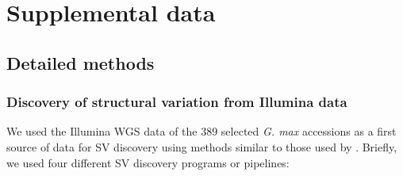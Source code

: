 \chapter*{Supplemental data}
\label{supdata}

\renewcommand\thefigure{S\arabic{figure}} 
\setcounter{figure}{0}
\setcounter{table}{0}
\renewcommand\thetable{S\arabic{table}} 

\newcommand{\getvar}[1]{\DTLfetch{variables}{key}{#1}{value}}

\section*{Detailed methods}
\label{annexe-sv-gwas-detailed-methods}

\subsection*{Discovery of structural variation from Illumina data}
\label{sv-gwas-sv-discovery-illumina}

We used the Illumina WGS data of the 389 selected \emph{G. max} accessions as a
first source of data for SV discovery using methods similar to those used by
\cite{lemay2022}.  Briefly, we used four different SV discovery programs or
pipelines: 

